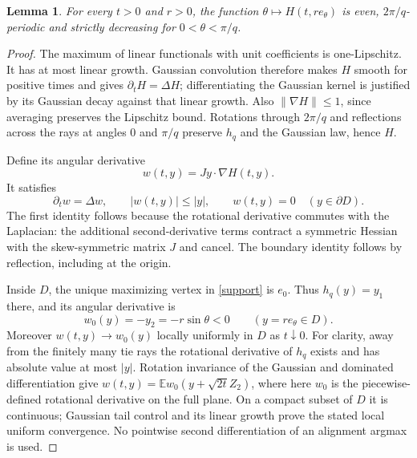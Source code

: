 \documentclass[11pt]{article}
\newtheorem{lemma}[theorem]{Lemma}
\newcommand{\E}{\mathbb E}
\begin{document}
\begin{lemma}\label{heat}
For every $t>0$ and $r>0$, the function
$\theta\mapsto H(t,r e_\theta)$ is even, $2\pi/q$-periodic and
strictly decreasing for $0<\theta<\pi/q$.
\end{lemma}
\begin{proof}
The maximum of linear functionals with unit coefficients is
one-Lipschitz. It has at most linear growth. Gaussian convolution
therefore makes $H$ smooth for positive times and gives
$\partial_tH=\Delta H$; differentiating the Gaussian kernel is
justified by its Gaussian decay against that linear growth.
Also $\|\nabla H\|\leq1$, since averaging preserves the Lipschitz
bound. Rotations through $2\pi/q$ and reflections across the rays at
angles $0$ and $\pi/q$ preserve $h_q$ and the Gaussian law, hence $H$.

Define its angular derivative
\[
 w(t,y)=Jy\cdot\nabla H(t,y).
\]
It satisfies
\begin{equation}\label{wproperties}
 \partial_tw=\Delta w,\qquad |w(t,y)|\leq|y|,
 \qquad w(t,y)=0\quad(y\in\partial D).
\end{equation}
The first identity follows because the rotational derivative commutes
with the Laplacian: the additional second-derivative terms contract a
symmetric Hessian with the skew-symmetric matrix $J$ and cancel.
The boundary identity follows by reflection, including at the origin.

Inside $D$, the unique maximizing vertex in \eqref{support} is $e_0$.
Thus $h_q(y)=y_1$ there, and its angular derivative is
\begin{equation}\label{initial}
 w_0(y)=-y_2=-r\sin\theta<0\qquad(y=r e_\theta\in D).
\end{equation}
Moreover $w(t,y)\to w_0(y)$ locally uniformly in $D$ as $t\downarrow0$.
For clarity, away from the finitely many tie rays the rotational
derivative of $h_q$ exists and has absolute value at most $|y|$.
Rotation invariance of the Gaussian and dominated differentiation give
$w(t,y)=\E w_0(y+\sqrt{2t}Z_2)$, where here $w_0$ is the
piecewise-defined rotational derivative on the full plane.
On a compact subset of $D$ it is continuous; Gaussian tail control
and its linear growth prove the stated local uniform convergence.
No pointwise second differentiation of an alignment argmax is used.


\end{proof}
\end{document}
